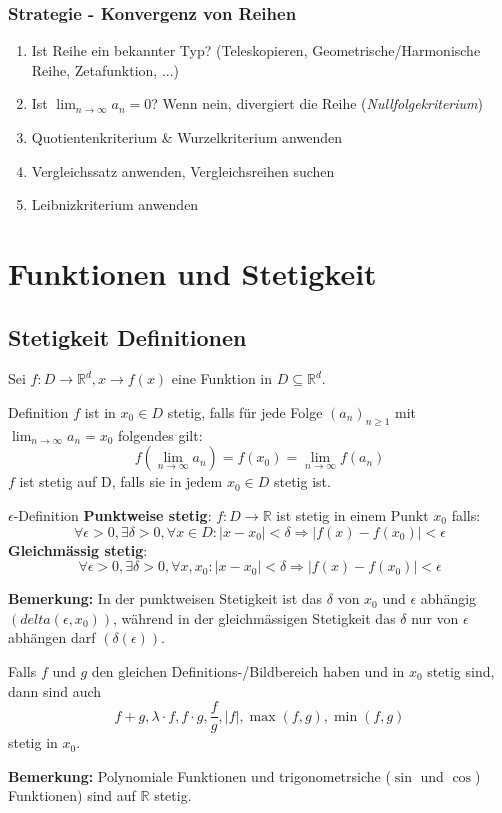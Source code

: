 \documentclass[a4paper,8pt]{extarticle}
\newenvironment{bemerkung}{
   \noindent \textbf{Bemerkung:  }}{}
\def\limn{\lim_{n\to \infty}}
\def\R{\mathbb{R}}
\begin{document}
\subsubsection{Strategie - Konvergenz von Reihen}
\begin{enumerate}
 \item Ist Reihe ein bekannter Typ? (Teleskopieren, Geometrische/Harmonische Reihe, Zetafunktion, ...)
 \item Ist $\limn a_n = 0$? Wenn nein, divergiert die Reihe (\textit{Nullfolgekriterium})
 \item Quotientenkriterium \& Wurzelkriterium anwenden
 \item Vergleichssatz anwenden, Vergleichsreihen suchen
 \item Leibnizkriterium anwenden
\end{enumerate}

\section{Funktionen und Stetigkeit}
\subsection{Stetigkeit Definitionen}
Sei $f : D \to \R^d, x \to f(x)$ eine Funktion in $D \subseteq \R^d$.
\begin{mainbox}{Definition}
 $f$ ist in $x_0 \in D$ stetig, falls für jede Folge $(a_n)_{n \geq 1}$ mit $\limn a_n = x_0$ folgendes gilt: $$f(\limn a_n) = f(x_0) = \limn f(a_n)$$
 $f$ ist stetig auf D, falls sie in jedem $x_0 \in D$ stetig ist.
\end{mainbox}
\begin{mainbox}{$\epsilon$-Definition}
  \textbf{Punktweise stetig}: $f: D \to \R$ ist stetig in einem Punkt $x_0$ falls: $$\forall \epsilon > 0, \exists \delta > 0, \forall x \in D: |x - x_0| < \delta \Rightarrow |f(x) - f(x_0)| < \epsilon$$
  \textbf{Gleichmässig stetig}: $$\forall \epsilon > 0, \exists \delta > 0, \forall x, x_0 : |x - x_0| < \delta \Rightarrow |f(x) - f(x_0)| < \epsilon$$

 \end{mainbox}
\begin{bemerkung}
  In der punktweisen Stetigkeit ist das $\delta$ von $x_0$ und $\epsilon$ abhängig $(delta(\epsilon, x_0))$, während in der gleichmässigen Stetigkeit das $\delta$ nur von $\epsilon$ abhängen darf $(\delta(\epsilon))$.
\end{bemerkung}
\begin{subbox}{}
 Falls $f$ und $g$ den gleichen Definitions-/Bildbereich haben und in $x_0$ stetig sind, dann sind auch $$f + g, \lambda \cdot f, f \cdot g, \frac{f}{g}, |f|, \max(f,g), \min(f,g)$$ stetig in $x_0$.
\end{subbox}
\begin{bemerkung}
  Polynomiale Funktionen und trigonometrsiche ($\sin$ und $\cos$) Funktionen) sind auf $\R$ stetig.
\end{bemerkung}
\end{document}
